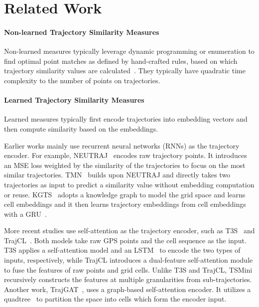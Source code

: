 \section{Related Work}\label{sec:relatedwork}

\paragraph{Non-learned Trajectory Similarity Measures} 
Non-learned measures typically leverage dynamic programming or enumeration to find optimal point matches as defined by hand-crafted rules, based on which trajectory similarity values are calculated~\cite{hausdorff,dfrechet,lcss,erp,edr,dtw,edwp}. They typically have quadratic time complexity to the number of points on trajectories.


\paragraph{Learned Trajectory Similarity Measures} %
Learned measures typically first encode trajectories into embedding vectors and then compute similarity based on the embeddings.


Earlier works mainly use recurrent neural networks (RNNs) as the trajectory encoder.
For example, NEUTRAJ~\cite{neutraj} encodes raw trajectory points. It introduces an MSE loss weighted by the similarity of the trajectories to focus on the most similar trajectories.
TMN~\cite{tmn} builds upon NEUTRAJ and directly 
takes two trajectories as input to predict a similarity value without embedding computation or reuse. 
KGTS~\cite{kgts} adopts a knowledge graph to model the grid space and learns cell embeddings and it then learns trajectory embeddings from cell embeddings with a GRU~\cite{gru}. 


More recent studies use self-attention as the trajectory encoder, such as T3S~\cite{t3s} and TrajCL~\cite{trajcl}.
Both models take raw GPS points and the cell sequence as the input. T3S applies a self-attention model and an LSTM~\cite{lstm} to encode the two types of inputs, respectively, while TrajCL introduces a dual-feature self-attention module to fuse the features of raw points and grid cells.  Unlike T3S and TrajCL, TSMini recursively constructs the features at multiple granularities from sub-trajectories.
Another work, TrajGAT~\cite{trajgat},  uses a graph-based self-attention  encoder. It utilizes a quadtree~\cite{quadtree} to partition the space into cells which form the encoder input.

